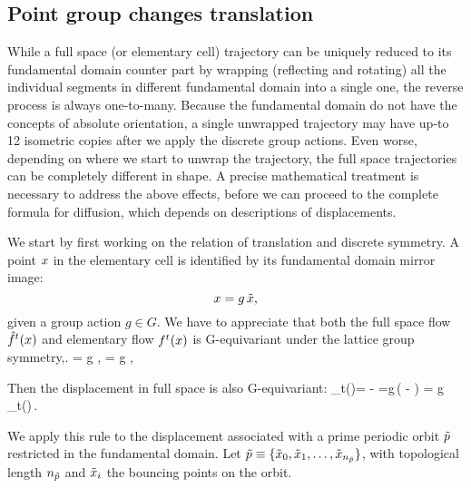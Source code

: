 
\subsection{Point group changes translation \label{sec-point-group-translation}}

While a full space (or elementary cell) trajectory can be uniquely reduced to its fundamental domain counter part by wrapping (reflecting and rotating) all the individual segments in different fundamental domain into a single one, the reverse process is always one-to-many. Because the fundamental domain do not have the concepts of absolute orientation, a single unwrapped trajectory may have up-to 12 isometric copies after we apply the discrete group actions. Even worse, depending on where we start to unwrap the trajectory, the full space trajectories can be completely different in shape. A precise mathematical treatment is necessary to address the above effects, before we can proceed to the complete formula for diffusion, which depends on descriptions of displacements.

We start by first working on the relation of translation and discrete symmetry. A point $x$ in the elementary cell is identified by its
fundamental domain mirror image:
\[ %
\ssp=g\,\tx,
\] %
given a group action $g\in G$. We have to appreciate that both the full space flow ${\hat{f}^{t}(x)}$ and elementary flow ${f^{t}(x)} $ is G-equivariant under the lattice group symmetry,.
\beq
{} = g\,\,,
 = g\,\,,
\label{eq-equivariance-flow}
\eeq

Then the displacement in full space is also G-equivariant:
\beq
\hn_t(\ssp)=  - =g\,( - ) = g\,\hn_t(\tx)\,.
\label{eq-equivariance-disp}
\eeq

We apply this rule to the displacement associated with a prime
periodic orbit ${\tilde p}$ restricted in the fundamental domain.
Let ${\tilde p}\equiv\{\tilde x_0,\tilde x_1,\ldots,\tilde x_{{n_{{\tilde p}}}}\}$, with topological length
${n_{{\tilde p}}}$ and $\tilde x_i$ the bouncing points on the orbit.


